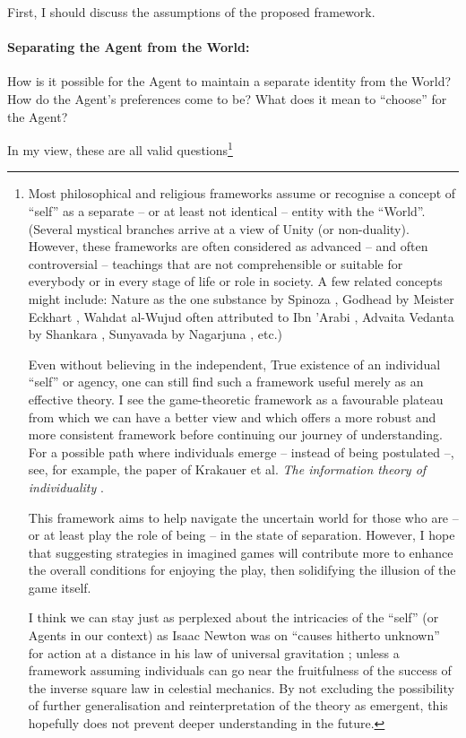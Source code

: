 \documentclass{article}
\begin{document}
First, I should discuss the assumptions of the proposed framework.

\paragraph{Separating the Agent from the World:}
How is it possible for the Agent to maintain a separate identity from the World? How do the Agent's preferences come to be? What does it mean to ``choose'' for the Agent?

In my view, these are all valid questions\footnote{
Most philosophical and religious frameworks assume or recognise a concept of ``self'' \cite{sep:Identity,book:WorldsReligions,book:FunfWeltreligionen} as a separate -- or at least not identical -- entity with the ``World''.
(Several mystical branches arrive at a view of Unity (or non-duality). However, these frameworks are often considered as advanced -- and often controversial -- teachings that are not comprehensible or suitable for everybody or in every stage of life or role in society. A few related concepts might include: Nature as the one substance by Spinoza \cite{book:SpinozaEthics, sep:SpinozaPhysics}, Godhead by Meister Eckhart \cite{book:RoyceEckhart,sep:Eckhart,book:Eckhart}, Wahdat al-Wujud often attributed to Ibn 'Arabi \cite{sep:IbnArabi,book:HistoryOfIslamicPhilosophy,book:IbnArabi}, Advaita Vedanta by Shankara \cite{sep:Shankara,book:AdvaitaVedanta}, Sunyavada by Nagarjuna \cite{sep:Nagarjuna,book:Nagarjuna}, etc.)

Even without believing in the independent, True existence of an individual ``self'' or agency, one can still find such a framework useful merely as an effective theory.
I see the game-theoretic framework as a favourable plateau from which we can have a better view and which offers a more robust and more consistent framework before continuing our journey of understanding.
For a possible path where individuals emerge -- instead of being postulated --, see, for example, the paper of Krakauer et al. \emph{The information theory of individuality}  \cite{paper:Individuality}.

This framework aims to help navigate the uncertain world for those who are -- or at least play the role of being -- in the state of separation. However, I hope that suggesting strategies in imagined games will contribute more to enhance the overall conditions for enjoying the play, then solidifying the illusion of the game itself.

I think we can stay just as perplexed about the intricacies of the ``self'' (or Agents in our context) as Isaac Newton was on ``causes hitherto unknown'' \cite{book:Principia, book:Principia1848, sep:Principia} for action at a distance in his law of universal gravitation \cite{book:CorrespondenceOfIsaacNewton,paper:NewtonOnActionAtADistance}; unless a framework assuming individuals can go near the fruitfulness of the success of the inverse square law in celestial mechanics. By not excluding the possibility of further generalisation and reinterpretation of the theory as emergent, this hopefully does not prevent deeper understanding in the future.
}
\end{document}
